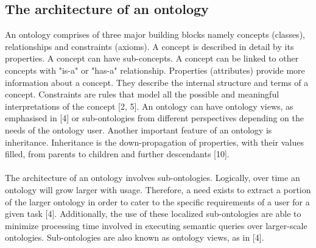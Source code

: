 \documentclass[conference, compsoc]{IEEEtran}
\begin{document}
\subsection{The architecture of an ontology}
An ontology comprises of three major building blocks namely concepts (classes), relationships and constraints (axioms). A concept is described in detail by its properties. A concept can have sub-concepts. A concept can be linked to other concepts with "is-a" or "has-a" relationship. Properties (attributes) provide more information about a concept. They describe the internal structure and terms of a concept. Constraints are rules that model all the possible and meaningful interpretations of the concept [2, 5]. An ontology can have ontology views, as emphasised in [4] or sub-ontologies from different perspectives depending on the needs of the ontology user. Another important feature of an ontology is inheritance. Inheritance is the down-propagation of properties, with their values filled, from parents to children and further descendants [10].
\\
\\
The architecture of an ontology involves sub-ontologies. Logically, over time an ontology will grow larger with usage. Therefore, a need exists to extract a portion of the larger ontology in order to cater to the specific requirements of a user for a given task [4]. Additionally, the use of these localized sub-ontologies are able to minimize processing time involved in executing semantic queries over larger-scale ontologies. Sub-ontologies are also known as ontology views, as in [4].
\end{document}
